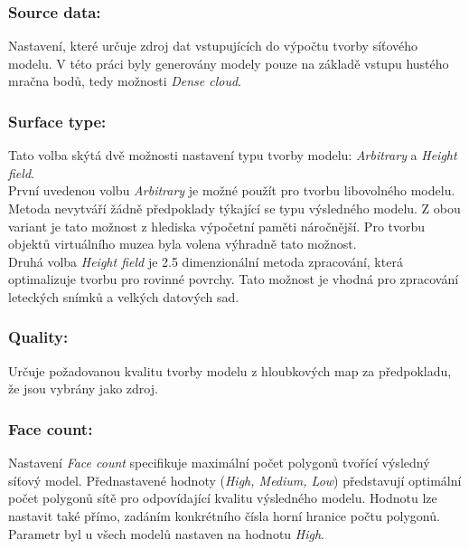 \documentclass[a4paper, 12pt]{report}
\begin{document}
\subsubsection*{Source data:}
Nastavení, které určuje zdroj dat vstupujících do výpočtu tvorby síťového modelu. V této práci byly generovány modely pouze na základě vstupu hustého mračna bodů, tedy možnosti \textit{Dense cloud}.

\subsubsection*{Surface type:}
Tato volba skýtá dvě možnosti nastavení typu tvorby modelu: \textit{Arbitrary} a \textit{Height field}. \\
První uvedenou volbu \textit{Arbitrary} je možné použít pro tvorbu libovolného modelu. Metoda nevytváří žádně předpoklady týkající se typu výsledného modelu. Z obou variant je tato možnost z hlediska výpočetní paměti náročnější. Pro tvorbu objektů virtuálního muzea byla volena výhradně tato možnost.\\
Druhá volba \textit{Height field} je 2.5 dimenzionální metoda zpracování, která optimalizuje tvorbu pro rovinné povrchy. Tato možnost je vhodná pro zpracování leteckých snímků a velkých datových sad. 

\subsubsection*{Quality:}
Určuje požadovanou kvalitu tvorby modelu z hloubkových map za předpokladu, že jsou vybrány jako zdroj.

\subsubsection*{Face count:}
Nastavení \textit{Face count} specifikuje maximální počet polygonů tvořící výsledný síťový model. Přednastavené hodnoty (\textit{High, Medium, Low}) představují optimální počet polygonů sítě pro odpovídající kvalitu výsledného modelu. Hodnotu lze nastavit také přímo, zadáním konkrétního čísla horní hranice počtu polygonů. Parametr byl u všech modelů nastaven na hodnotu \textit{High}.
 
\end{document}
